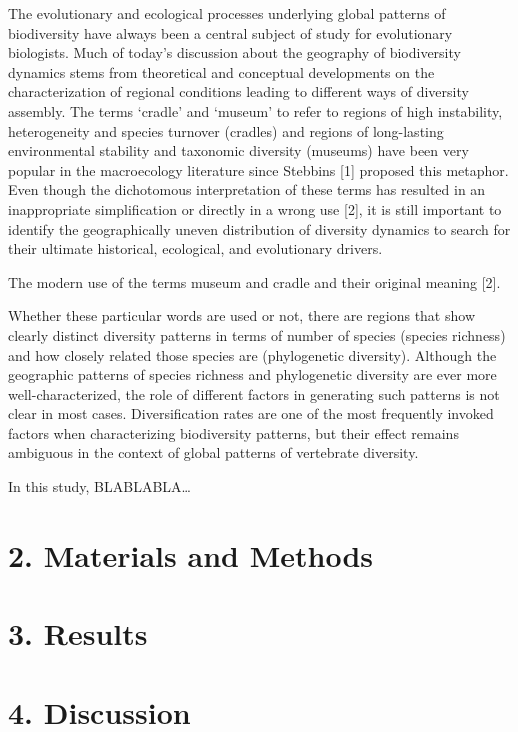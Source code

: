 \documentclass[
  11pt,
]{article}
\begin{document}
The evolutionary and ecological processes underlying global patterns of
biodiversity have always been a central subject of study for
evolutionary biologists. Much of today's discussion about the geography
of biodiversity dynamics stems from theoretical and conceptual
developments on the characterization of regional conditions leading to
different ways of diversity assembly. The terms `cradle' and `museum' to
refer to regions of high instability, heterogeneity and species turnover
(cradles) and regions of long-lasting environmental stability and
taxonomic diversity (museums) have been very popular in the macroecology
literature since Stebbins {[}1{]} proposed this metaphor. Even though
the dichotomous interpretation of these terms has resulted in an
inappropriate simplification or directly in a wrong use {[}2{]}, it is
still important to identify the geographically uneven distribution of
diversity dynamics to search for their ultimate historical, ecological,
and evolutionary drivers. \hfill\break

The modern use of the terms museum and cradle and their original meaning
{[}2{]}. \hfill\break

Whether these particular words are used or not, there are regions that
show clearly distinct diversity patterns in terms of number of species
(species richness) and how closely related those species are
(phylogenetic diversity). Although the geographic patterns of species
richness and phylogenetic diversity are ever more well-characterized,
the role of different factors in generating such patterns is not clear
in most cases. Diversification rates are one of the most frequently
invoked factors when characterizing biodiversity patterns, but their
effect remains ambiguous in the context of global patterns of vertebrate
diversity. \hfill\break

In this study, BLABLABLA\ldots{}

\hypertarget{materials-and-methods}{%
\section{2. Materials and Methods}\label{materials-and-methods}}

\hypertarget{results}{%
\section{3. Results}\label{results}}

\hypertarget{discussion}{%
\section{4. Discussion}\label{discussion}}
\end{document}
